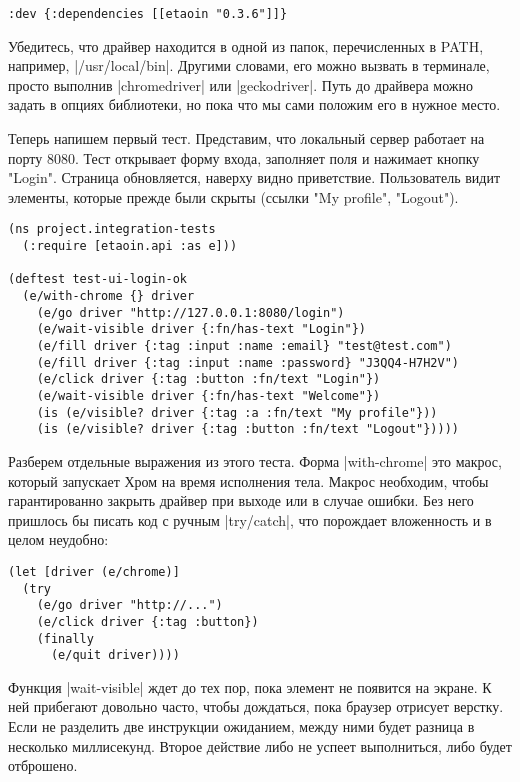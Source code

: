 \begin{verbatim}
:dev {:dependencies [[etaoin "0.3.6"]]}
\end{verbatim}

Убедитесь, что драйвер находится в одной из папок, перечисленных в PATH,
например, \spverb|/usr/local/bin|. Другими словами, его можно вызвать в терминале,
просто выполнив \spverb|chromedriver| или \spverb|geckodriver|. Путь до драйвера можно задать
в опциях библиотеки, но пока что мы сами положим его в нужное место.

Теперь напишем первый тест. Представим, что локальный сервер работает на
порту 8080. Тест открывает форму входа, заполняет поля и нажимает кнопку
"Login". Страница обновляется, наверху видно приветствие. Пользователь видит
элементы, которые прежде были скрыты (ссылки "My profile", "Logout").

\begin{verbatim}
(ns project.integration-tests
  (:require [etaoin.api :as e]))

(deftest test-ui-login-ok
  (e/with-chrome {} driver
    (e/go driver "http://127.0.0.1:8080/login")
    (e/wait-visible driver {:fn/has-text "Login"})
    (e/fill driver {:tag :input :name :email} "test@test.com")
    (e/fill driver {:tag :input :name :password} "J3QQ4-H7H2V")
    (e/click driver {:tag :button :fn/text "Login"})
    (e/wait-visible driver {:fn/has-text "Welcome"})
    (is (e/visible? driver {:tag :a :fn/text "My profile"}))
    (is (e/visible? driver {:tag :button :fn/text "Logout"}))))
\end{verbatim}

Разберем отдельные выражения из этого теста. Форма \spverb|with-chrome| это макрос,
который запускает Хром на время исполнения тела. Макрос необходим, чтобы
гарантированно закрыть драйвер при выходе или в случае ошибки. Без него пришлось
бы писать код с ручным \spverb|try/catch|, что порождает вложенность и в целом
неудобно:

\begin{verbatim}
(let [driver (e/chrome)]
  (try
    (e/go driver "http://...")
    (e/click driver {:tag :button})
    (finally
      (e/quit driver))))
\end{verbatim}

Функция \spverb|wait-visible| ждет до тех пор, пока элемент не появится на экране. К
ней прибегают довольно часто, чтобы дождаться, пока браузер отрисует
верстку. Если не разделить две инструкции ожиданием, между ними будет разница в
несколько миллисекунд. Второе действие либо не успеет выполниться, либо будет
отброшено.


